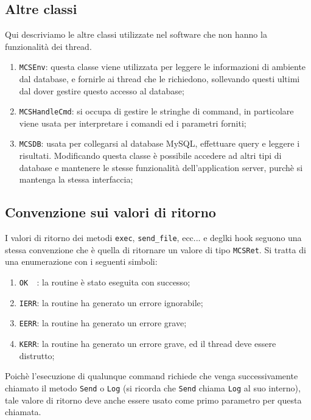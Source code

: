 \subsection{Altre classi}
Qui descriviamo le altre classi utilizzate nel software che non hanno
la funzionalit\`a dei thread.
\begin{enumerate}
\item \verb|MCSEnv|: questa classe viene utilizzata per leggere le
  informazioni di ambiente dal database, e fornirle ai thread che le
  richiedono, sollevando questi ultimi dal dover gestire questo
  accesso al database;
\item \verb|MCSHandleCmd|: si occupa di gestire le stringhe di
  command, in particolare viene usata per interpretare i comandi ed i
  parametri forniti;
\item \verb|MCSDB|: usata per collegarsi al database MySQL, effettuare
  query e leggere i risultati. Modificando questa classe \`e possibile
  accedere ad altri tipi di database e mantenere le stesse
  funzionalit\`a dell'application server, purch\`e si mantenga la
  stessa interfaccia;
\end{enumerate}

\subsection{Convenzione sui valori di ritorno}\label{ssvalrit}
I valori di ritorno dei metodi \verb|exec|, \verb|send_file|, ecc... e
deglki hook seguono una stessa convenzione che \`e quella di ritornare
un valore di tipo \verb|MCSRet|. Si tratta di una enumerazione con i
seguenti simboli:
\begin{enumerate}
\item \verb|OK  |: la routine  \`e stato eseguita con successo;
\item \verb|IERR|: la routine ha generato un errore ignorabile;
\item \verb|EERR|: la routine ha generato un errore grave;
\item \verb|KERR|: la routine ha generato un errore grave, ed il
  thread deve essere distrutto;
\end{enumerate}
%
Poich\`e l'esecuzione di qualunque command richiede che venga
successivamente chiamato il metodo \verb|Send| o \verb|Log| (si
ricorda che \verb|Send| chiama \verb|Log| al suo interno), tale valore
di ritorno deve anche essere usato come primo parametro per questa
chiamata.


